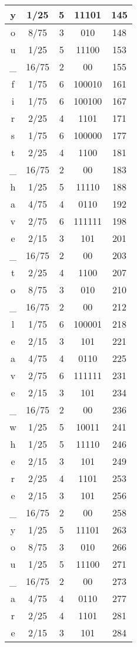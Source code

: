 \begin{center}
\begin{longtable}{|c|c|c|c|c|}
\hline  y&1/25&5&11101&145\\  \hline  o&8/75&3&010&148\\  \hline  u&1/25&5&11100&153\\  \hline  \_&16/75&2&00&155\\  \hline  f&1/75&6&100010&161\\  \hline  i&1/75&6&100100&167\\  \hline  r&2/25&4&1101&171\\  \hline  s&1/75&6&100000&177\\  \hline  t&2/25&4&1100&181\\  \hline  \_&16/75&2&00&183\\  \hline  h&1/25&5&11110&188\\  \hline  a&4/75&4&0110&192\\  \hline  v&2/75&6&111111&198\\  \hline  e&2/15&3&101&201\\  \hline  \_&16/75&2&00&203\\  \hline  t&2/25&4&1100&207\\  \hline  o&8/75&3&010&210\\  \hline  \_&16/75&2&00&212\\  \hline  l&1/75&6&100001&218\\  \hline  e&2/15&3&101&221\\  \hline  a&4/75&4&0110&225\\  \hline  v&2/75&6&111111&231\\  \hline  e&2/15&3&101&234\\  \hline  \_&16/75&2&00&236\\  \hline  w&1/25&5&10011&241\\  \hline  h&1/25&5&11110&246\\  \hline  e&2/15&3&101&249\\  \hline  r&2/25&4&1101&253\\  \hline  e&2/15&3&101&256\\  \hline  \_&16/75&2&00&258\\  \hline  y&1/25&5&11101&263\\  \hline  o&8/75&3&010&266\\  \hline  u&1/25&5&11100&271\\  \hline  \_&16/75&2&00&273\\  \hline  a&4/75&4&0110&277\\  \hline  r&2/25&4&1101&281\\  \hline  e&2/15&3&101&284\\  \hline 
    \end{longtable}
\end{center}

